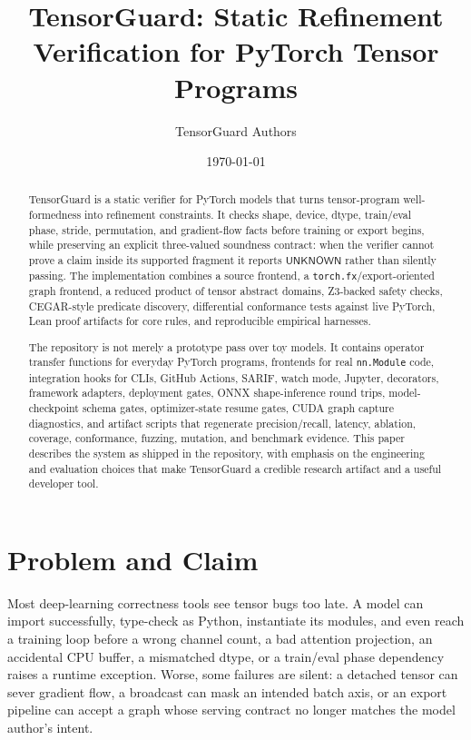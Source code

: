 \documentclass[11pt]{article}
\title{\textbf{TensorGuard: Static Refinement Verification for PyTorch Tensor Programs}}
\author{TensorGuard Authors}
\date{\today}
\newcommand{\tg}{TensorGuard}
\newcommand{\unknown}{\ensuremath{\mathsf{UNKNOWN}}}
\begin{document}
\maketitle

\begin{abstract}
\tg{} is a static verifier for PyTorch models that turns tensor-program
well-formedness into refinement constraints.  It checks shape, device, dtype,
train/eval phase, stride, permutation, and gradient-flow facts before training
or export begins, while preserving an explicit three-valued soundness contract:
when the verifier cannot prove a claim inside its supported fragment it reports
\unknown{} rather than silently passing.  The implementation combines a source
frontend, a \texttt{torch.fx}/export-oriented graph frontend, a reduced product
of tensor abstract domains, Z3-backed safety checks, CEGAR-style predicate
discovery, differential conformance tests against live PyTorch, Lean proof
artifacts for core rules, and reproducible empirical harnesses.

The repository is not merely a prototype pass over toy models.  It contains
operator transfer functions for everyday PyTorch programs, frontends for real
\texttt{nn.Module} code, integration hooks for CLIs, GitHub Actions, SARIF,
watch mode, Jupyter, decorators, framework adapters, deployment gates, ONNX
shape-inference round trips, model-checkpoint schema gates,
optimizer-state resume gates, CUDA graph capture diagnostics, and artifact scripts that regenerate
precision/recall, latency, ablation, coverage, conformance, fuzzing, mutation,
and benchmark evidence.  This paper describes
the system as shipped in the repository, with emphasis on the engineering and
evaluation choices that make \tg{} a credible research artifact and a useful
developer tool.
\end{abstract}

\clearpage

\section{Problem and Claim}

Most deep-learning correctness tools see tensor bugs too late.  A model can
import successfully, type-check as Python, instantiate its modules, and even
reach a training loop before a wrong channel count, a bad attention projection,
an accidental CPU buffer, a mismatched dtype, or a train/eval phase dependency
raises a runtime exception.  Worse, some failures are silent: a detached tensor
can sever gradient flow, a broadcast can mask an intended batch axis, or an
export pipeline can accept a graph whose serving contract no longer matches the
model author's intent.
\end{document}
